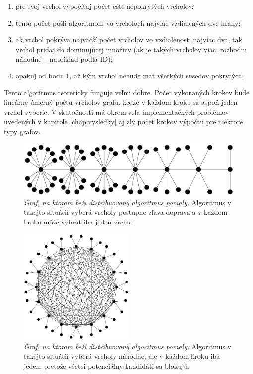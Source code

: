\begin{enumerate}
	\item pre svoj vrchol vypočítaj počet ešte nepokrytých vrcholov;
	\item tento počet pošli algoritmom vo vrcholoch najviac vzdialených dve 
		hrany;
	\item ak vrchol pokrýva najväčší počet vrcholov vo vzdialenosti najviac 
		dva, tak vrchol pridaj do dominujúcej množiny (ak je takých vrcholov 
		viac, rozhodni náhodne -- napríklad podľa ID);
	\item opakuj od bodu 1, až kým vrchol nebude mať všetkých susedov 
		pokrytých;
\end{enumerate}

Tento algoritmus teoreticky funguje veľmi dobre. Počet vykonaných krokov bude 
lineárne úmerný počtu vrcholov grafu, keďže v každom kroku sa aspoň jeden 
vrchol vyberie. V skutočnosti má okrem veľa implementačných problémov uvedených 
v kapitole \ref{chap:vysledky} aj zlý počet krokov výpočtu pre niektoré typy 
grafov.

\begin{figure}
	\centering
	\includegraphics[width=1.0\textwidth]{obrazky/zle1}
	\caption{\emph{Graf, na ktorom beží distribuovaný algoritmus pomaly.} 
		Algoritmus v takejto situácií vyberá vrcholy postupne zľava doprava 
		a v každom kroku môže vybrať iba jeden vrchol.}
	\label{img:zle1}
\end{figure}

\begin{figure}
	\centering
	\includegraphics[width=0.5\textwidth]{obrazky/zle2}
	\caption{\emph{Graf, na ktorom beží distribuovaný algoritmus pomaly.} 
		Algoritmus v takejto situácií vyberá vrcholy náhodne, ale v každom 
		kroku iba jeden, pretože všetci potenciálny kandidáti sa blokujú.}
	\label{img:zle2}
\end{figure}

